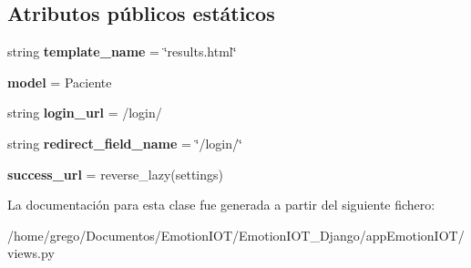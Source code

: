 \subsection*{Atributos públicos estáticos}
\begin{DoxyCompactItemize}
\item 
string {\bfseries template\+\_\+name} = \char`\"{}results.\+html\char`\"{}\hypertarget{classappEmotionIOT_1_1views_1_1Resultados_aa9ec894ca6b14eacd5ca016c1fccd1aa}{}\label{classappEmotionIOT_1_1views_1_1Resultados_aa9ec894ca6b14eacd5ca016c1fccd1aa}

\item 
{\bfseries model} = Paciente\hypertarget{classappEmotionIOT_1_1views_1_1Resultados_a0fcd1486a35ec735e485b67757380db4}{}\label{classappEmotionIOT_1_1views_1_1Resultados_a0fcd1486a35ec735e485b67757380db4}

\item 
string {\bfseries login\+\_\+url} = \textquotesingle{}/login/\textquotesingle{}\hypertarget{classappEmotionIOT_1_1views_1_1Resultados_aa3f03da4d6bdda33a5fa70a6bde6c60a}{}\label{classappEmotionIOT_1_1views_1_1Resultados_aa3f03da4d6bdda33a5fa70a6bde6c60a}

\item 
string {\bfseries redirect\+\_\+field\+\_\+name} = \char`\"{}/login/\char`\"{}\hypertarget{classappEmotionIOT_1_1views_1_1Resultados_a131ddf4cc60c89446be43efe76bbbc3d}{}\label{classappEmotionIOT_1_1views_1_1Resultados_a131ddf4cc60c89446be43efe76bbbc3d}

\item 
{\bfseries success\+\_\+url} = reverse\+\_\+lazy(\textquotesingle{}settings\textquotesingle{})\hypertarget{classappEmotionIOT_1_1views_1_1Resultados_a51616be92a17af83a189a920d6ac28ad}{}\label{classappEmotionIOT_1_1views_1_1Resultados_a51616be92a17af83a189a920d6ac28ad}

\end{DoxyCompactItemize}


La documentación para esta clase fue generada a partir del siguiente fichero\+:\begin{DoxyCompactItemize}
\item 
/home/grego/\+Documentos/\+Emotion\+I\+O\+T/\+Emotion\+I\+O\+T\+\_\+\+Django/app\+Emotion\+I\+O\+T/views.\+py\end{DoxyCompactItemize}
